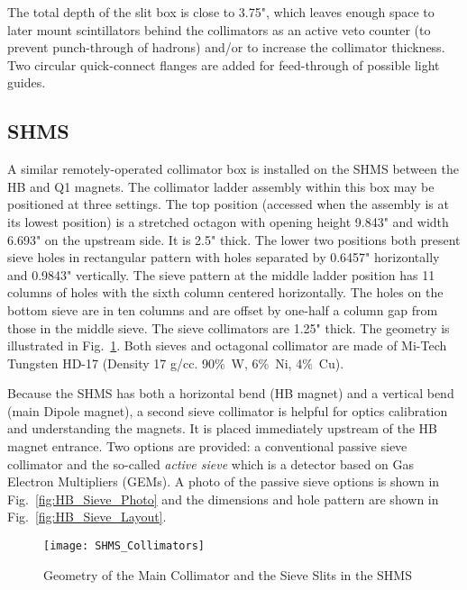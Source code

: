 The total depth of the slit box is close to 3.75", which leaves
enough space to later mount scintillators behind the collimators as an active
veto counter (to prevent punch-through of hadrons) and/or to increase
the collimator thickness. Two circular quick-connect flanges are
added for feed-through of possible light guides.

\subsection{SHMS}
\label{sssec:shms_slit}
A similar remotely-operated collimator box is installed on the SHMS between the
HB and Q1 magnets. The collimator ladder assembly within this box may be positioned
at three settings. The top position (accessed when the assembly is at its lowest
position) is a stretched octagon with opening height 9.843" and width 6.693" on the
upstream side. It is 2.5" thick. The lower two positions both present sieve holes in
rectangular pattern with holes separated by 0.6457" horizontally and 0.9843"
vertically. The sieve pattern at the middle ladder position has 11 columns of holes with
the sixth column centered horizontally. The holes on the bottom sieve are in ten
columns and are offset by one-half a column gap from those in the middle sieve.
The sieve collimators are 1.25" thick. The geometry is illustrated in Fig.~\ref{fig:SHMS_Collimators}.
Both sieves and octagonal collimator are
made of Mi-Tech\texttrademark{} Tungsten HD-17 (Density 17 g/cc. 90\%~W, 6\%~Ni, 4\%~Cu).

Because the SHMS has both a horizontal bend (HB magnet) and a vertical bend (main Dipole
magnet), a second sieve collimator is helpful for optics calibration and understanding the magnets.
It is placed immediately
upstream of the HB magnet entrance. Two options are provided: a conventional passive
sieve collimator and the so-called \textit{active sieve} which is a detector based on Gas Electron
Multipliers (GEMs).  A photo of the passive sieve options is shown in Fig.~\ref{fig:HB_Sieve_Photo}
and the dimensions and hole pattern are shown in Fig.~\ref{fig:HB_Sieve_Layout}.

\begin{figure}
\begin{center}
\texttt{[image: SHMS\_Collimators]}
\caption{Geometry of the Main Collimator and the Sieve Slits in the SHMS \label{fig:SHMS_Collimators}}
\end{center}
\end{figure}

